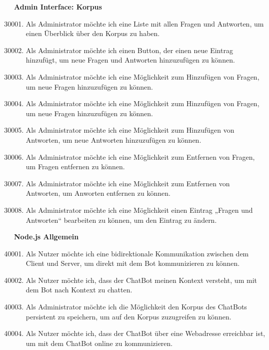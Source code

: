 \textbf{Admin Interface: Korpus}
\begin{enumerate}[leftmargin=*,labelindent=40pt,label=u\arabic*.]
    \setcounter{enumi}{30000}
    \item Als Administrator möchte ich eine Liste mit allen Fragen und Antworten, um einen Überblick über den Korpus zu haben.
    \item Als Administrator möchte ich einen Button, der einen neue Eintrag hinzufügt, um neue Fragen und Antworten hinzuzufügen zu können.
    \item Als Administrator möchte ich eine Möglichkeit zum Hinzufügen von Fragen, um neue Fragen hinzuzufügen zu können.
    \item Als Administrator möchte ich eine Möglichkeit zum Hinzufügen von Fragen, um neue Fragen hinzuzufügen zu können.
    \item Als Administrator möchte ich eine Möglichkeit zum Hinzufügen von Antworten, um neue Antworten hinzuzufügen zu können.
    \item Als Administrator möchte ich eine Möglichkeit zum Entfernen von Fragen, um Fragen entfernen zu können.
    \item Als Administrator möchte ich eine Möglichkeit zum Entfernen von Antworten, um Anworten entfernen zu können.
    \item Als Administrator möchte ich eine Möglichkeit einen Eintrag „Fragen und Antworten“ bearbeiten zu können, um den Eintrag zu ändern.
\end{enumerate}
\newpage
\textbf{Node.js Allgemein}
\begin{enumerate}[leftmargin=*,labelindent=40pt,label=u\arabic*.]
    \setcounter{enumi}{40000}
    \item Als Nutzer möchte ich eine bidirektionale Kommunikation zwischen dem Client und Server, um direkt mit dem Bot kommunizieren zu können.
    \item Als Nutzer möchte ich, dass der ChatBot meinen Kontext versteht, um mit dem Bot nach Kontext zu chatten.
    \item Als Administrator möchte ich die Möglichkeit den Korpus des ChatBots persistent zu speichern, um auf den Korpus zuzugreifen zu können.
    \item Als Nutzer möchte ich, dass der ChatBot über eine Webadresse erreichbar ist, um mit dem ChatBot online zu kommunizieren.
\end{enumerate}

